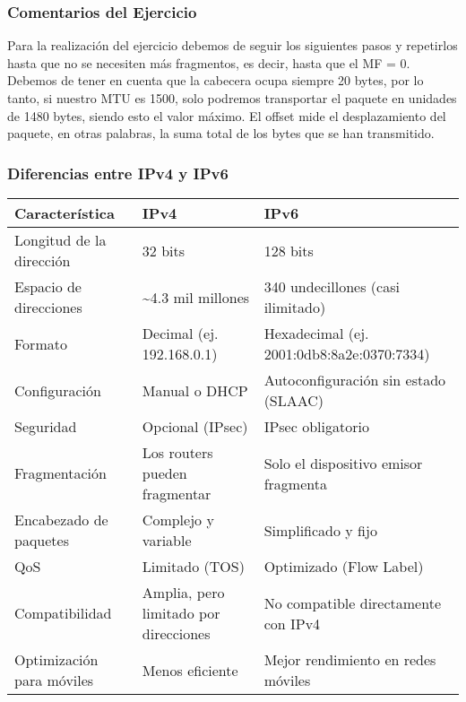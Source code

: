 \documentclass[a4paper,12pt]{article}
\begin{document}
\subsubsection*{Comentarios del Ejercicio}

Para la realización del ejercicio debemos de seguir los siguientes pasos y repetirlos hasta que no se necesiten más fragmentos, es decir, hasta que el MF = 0. Debemos de tener en cuenta que la cabecera ocupa siempre 20 bytes, por lo tanto, si nuestro MTU es 1500, solo podremos transportar el paquete en unidades de 1480 bytes, siendo esto el valor máximo. El offset mide el desplazamiento del paquete, en otras palabras, la suma total de los bytes que se han transmitido.


\subsubsection{Diferencias entre IPv4 y IPv6}


\begin{table}[H]
    \centering
    \begin{tabular}{|p{4cm}|p{4cm}|p{7cm}|}
    \hline
    \textbf{Característica} & \textbf{IPv4} & \textbf{IPv6} \\ \hline
    Longitud de la dirección & 32 bits & 128 bits \\ \hline
    Espacio de direcciones & \textasciitilde 4.3 mil millones & 340 undecillones (casi ilimitado) \\ \hline
    Formato & Decimal (ej. 192.168.0.1) & Hexadecimal (ej. 2001:0db8:8a2e:0370:7334) \\ \hline
    Configuración & Manual o DHCP & Autoconfiguración sin estado (SLAAC) \\ \hline
    Seguridad & Opcional (IPsec) & IPsec obligatorio \\ \hline
    Fragmentación & Los routers pueden fragmentar & Solo el dispositivo emisor fragmenta \\ \hline
    Encabezado de paquetes & Complejo y variable & Simplificado y fijo \\ \hline
    QoS & Limitado (TOS) & Optimizado (Flow Label) \\ \hline
    Compatibilidad & Amplia, pero limitado por direcciones & No compatible directamente con IPv4 \\ \hline
    Optimización para móviles & Menos eficiente & Mejor rendimiento en redes móviles \\ \hline
    \end{tabular}
\end{table}
\end{document}
